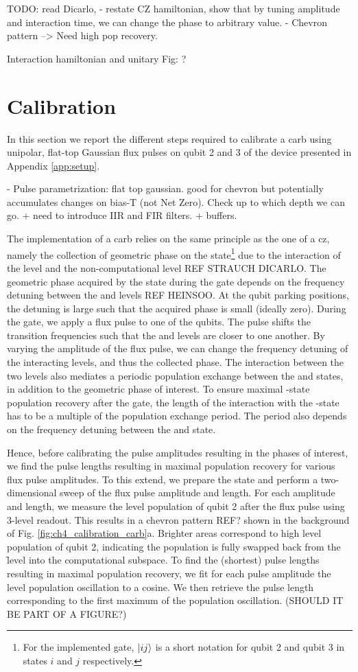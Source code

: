 TODO: read Dicarlo, 
- restate CZ hamiltonian, show that by tuning amplitude and interaction time, we can change the phase to arbitrary value. 
- Chevron pattern --> Need high pop recovery.

Interaction hamiltonian and unitary
Fig: ?
\section{Calibration} 

In this section we report the different steps required to calibrate a \gls{carb} using unipolar, flat-top Gaussian flux pulses on qubit 2 and 3 of the device presented in Appendix \ref{app:setup}.

- Pulse parametrization: flat top gaussian. good for chevron but potentially accumulates changes on bias-T (not Net Zero). 
 Check up to which depth we can go. + need to introduce IIR and FIR filters. + buffers.

The implementation of a \gls{carb} relies on the same principle as the one of a \gls{cz}, namely the collection of geometric phase on the \oo state\footnote{For the implemented gate, $\ket{ij}$ is a short notation for qubit 2 and qubit 3 in states $i$ and $j$ respectively.} due to the interaction of the \oo level and the non-computational \tz level REF STRAUCH DICARLO. The geometric phase acquired by the \oo state during the gate depends on the frequency detuning between the \oo and \tz levels REF HEINSOO. At the qubit parking positions, the detuning is large such that the acquired phase is small (ideally zero). During the gate, we apply a flux pulse to one of the qubits. The pulse shifts the transition frequencies such that the \oo and \tz levels are closer to one another. By varying the amplitude of the flux pulse, we can change the frequency detuning of the interacting levels, and thus the collected phase. The interaction between the two levels also mediates a periodic population exchange between the \oo and \tz states, in addition to the geometric phase of interest. To ensure maximal \oo-state population recovery after the gate, the length of the interaction with the \tz-state has to be a multiple of the population exchange period. The period also depends on the frequency detuning between the \oo and \tz state. 

Hence, before calibrating the pulse amplitudes resulting in the phases of interest, we find the pulse lengths resulting in maximal population recovery for various flux pulse amplitudes. To this extend, we prepare the \oo state and perform a two-dimensional sweep  of the flux pulse amplitude and length. For each amplitude and length, we measure the \e level population of qubit 2 after the flux pulse using 3-level readout. This results in a chevron pattern REF? shown in the background of Fig. \ref{fig:ch4_calibration_carb}a. Brighter areas correspond to high \e level population of qubit 2, indicating the population is fully swapped back from the \f level into the computational subspace. To find the (shortest) pulse lengths resulting in maximal population recovery, we fit for each pulse amplitude the \e level population oscillation to a cosine. We then retrieve the pulse length corresponding to the first maximum of the population oscillation. (SHOULD IT BE PART OF A FIGURE?)

